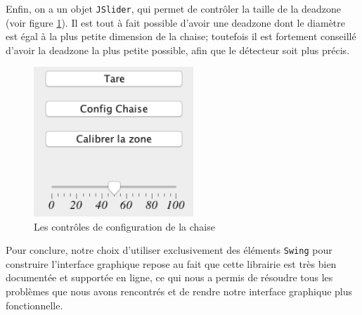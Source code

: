 \documentclass{polytech/polytech}
\begin{document}
Enfin, on a un objet \texttt{JSlider}, qui permet de contrôler la taille de la deadzone (voir figure \ref{fig:app_pc_chaise}). Il est tout à fait possible d'avoir une deadzone dont le diamètre est égal à la plus petite dimension de la chaise; toutefois il est fortement conseillé d'avoir la deadzone la plus petite possible, afin que le détecteur soit plus précis.

\begin{figure}[htbp]
\begin{center}
\includegraphics[width=6cm]{image/app_pc_chaise}
\end{center}
\caption{Les contrôles de configuration de la chaise}
\label{fig:app_pc_chaise}
\end{figure}

Pour conclure, notre choix d’utiliser exclusivement des éléments \texttt{Swing} pour construire l'interface graphique repose au fait que cette librairie est très bien documentée et supportée en ligne, ce qui nous a permis de résoudre tous les problèmes que nous avons rencontrés et de rendre notre interface graphique plus fonctionnelle.



\end{document}
